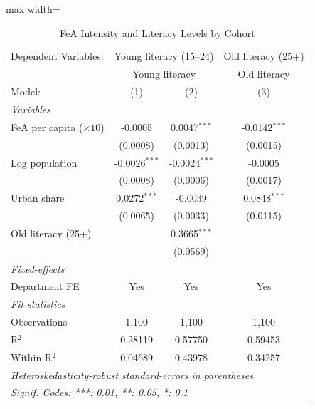 
\begin{table}[htbp]
   \caption{\label{tab:levels} FeA Intensity and Literacy Levels by Cohort}
   \centering
   \begin{adjustbox}{max width=\textwidth}\begin{tabular}{lccc}
      \tabularnewline \midrule \midrule
      Dependent Variables: & \multicolumn{2}{c}{Young literacy (15--24)} & Old literacy (25+)\\
       & \multicolumn{2}{c}{Young literacy} & Old literacy \\ 
      Model:                        & (1)             & (2)             & (3)\\  
      \midrule
      \emph{Variables}\\
      FeA per capita ($\times 10$)  & -0.0005         & 0.0047$^{***}$  & -0.0142$^{***}$\\   
                                    & (0.0008)        & (0.0013)        & (0.0015)\\   
      Log population                & -0.0026$^{***}$ & -0.0024$^{***}$ & -0.0005\\   
                                    & (0.0008)        & (0.0006)        & (0.0017)\\   
      Urban share                   & 0.0272$^{***}$  & -0.0039         & 0.0848$^{***}$\\   
                                    & (0.0065)        & (0.0033)        & (0.0115)\\   
      Old literacy (25+)            &                 & 0.3665$^{***}$  &   \\   
                                    &                 & (0.0569)        &   \\   
      \midrule
      \emph{Fixed-effects}\\
      Department FE                 & Yes             & Yes             & Yes\\  
      \midrule
      \emph{Fit statistics}\\
      Observations                  & 1,100           & 1,100           & 1,100\\  
      R$^2$                         & 0.28119         & 0.57750         & 0.59453\\  
      Within R$^2$                  & 0.04689         & 0.43978         & 0.34257\\  
      \midrule \midrule
      \multicolumn{4}{l}{\emph{Heteroskedasticity-robust standard-errors in parentheses}}\\
      \multicolumn{4}{l}{\emph{Signif. Codes: ***: 0.01, **: 0.05, *: 0.1}}\\
   \end{tabular}\end{adjustbox}
   

\end{table}
